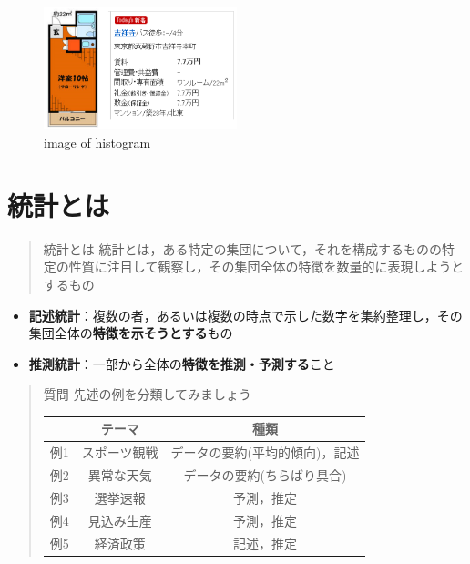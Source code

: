 \documentclass[
]{book}
\providecommand{\tightlist}{%
  \setlength{\itemsep}{0pt}\setlength{\parskip}{0pt}}
\theoremstyle{definition}
\theoremstyle{definition}
\theoremstyle{definition}
\theoremstyle{definition}
\theoremstyle{remark}
\begin{document}
\begin{figure}
\centering
\includegraphics[width=0.5\textwidth,height=\textheight]{images/lec01/fig_kichi_1room_example.png}
\caption{image of histogram}
\end{figure}

\hypertarget{ux7d71ux8a08ux3068ux306f}{%
\section{統計とは}\label{ux7d71ux8a08ux3068ux306f}}

\begin{quote}
統計とは
統計とは，ある特定の集団について，それを構成するものの特定の性質に注目して観察し，その集団全体の特徴を数量的に表現しようとするもの
\end{quote}

\begin{itemize}
\tightlist
\item
  \textbf{記述統計}：複数の者，あるいは複数の時点で示した数字を集約整理し，その集団全体の\textbf{特徴を示そうとする}もの
\item
  \textbf{推測統計}：一部から全体の\textbf{特徴を推測・予測する}こと
\end{itemize}

\begin{quote}
質問
先述の例を分類してみましょう

\begin{longtable}[]{@{}ccc@{}}
\toprule()
& テーマ & 種類 \\
\midrule()
\endhead
例1 & スポーツ観戦 & データの要約(平均的傾向)，記述 \\
例2 & 異常な天気 & データの要約(ちらばり具合) \\
例3 & 選挙速報 & 予測，推定 \\
例4 & 見込み生産 & 予測，推定 \\
例5 & 経済政策 & 記述，推定 \\
\bottomrule()
\end{longtable}
\end{quote}
\end{document}
